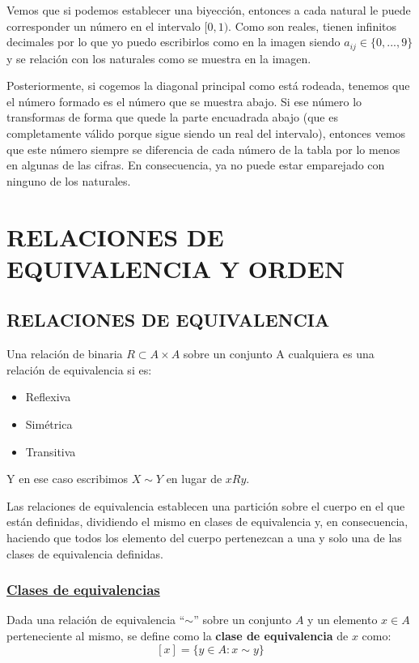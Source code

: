 \documentclass[10pt,a4paper,openright]{book}
\begin{document}
Vemos que si podemos establecer una biyección, entonces a cada natural le puede corresponder un número en el intervalo $[0,1)$. Como son reales, tienen infinitos decimales por lo que yo puedo escribirlos como en la imagen siendo $a_{ij}\in \{0, ..., 9\}$ y se relación con los naturales como se muestra en la imagen.\par
Posteriormente, si cogemos la diagonal principal como está rodeada, tenemos que el número formado es el número que se muestra abajo. Si ese número lo transformas de forma que quede la parte encuadrada abajo (que es completamente válido porque sigue siendo un real del intervalo), entonces vemos que este número siempre se diferencia de cada número de la tabla por lo menos en algunas de las cifras. En consecuencia, ya no puede estar emparejado con ninguno de los naturales.


\chapter*{RELACIONES DE \\ EQUIVALENCIA Y ORDEN}

\section*{RELACIONES DE EQUIVALENCIA}
Una relación de binaria $R\subset A\times A$ sobre un conjunto A cualquiera es una relación de equivalencia si es:
\begin{itemize}
\item Reflexiva
\item Simétrica
\item Transitiva
\end{itemize}
Y en ese caso escribimos $X\sim Y$ en lugar de $xRy$.\par
Las relaciones de equivalencia establecen una partición sobre el cuerpo en el que están definidas, dividiendo el mismo en clases de equivalencia y, en consecuencia, haciendo que todos los elemento del cuerpo pertenezcan a una y solo una de las clases de equivalencia definidas.

\subsection*{\underline{Clases de equivalencias}}
Dada una relación de equivalencia ``$\sim$'' sobre un conjunto $A$ y un elemento $x\in A$ perteneciente al mismo, se define como la \textbf{clase de equivalencia} de $x$ como:
$$[x]=\{y\in A: x\sim y\}$$
\end{document}
